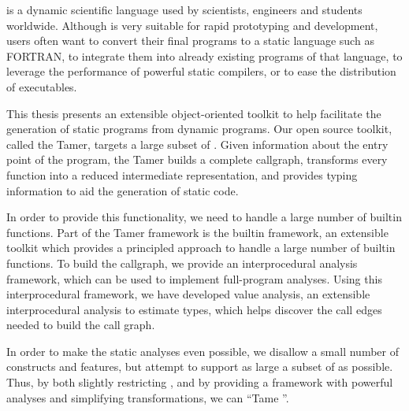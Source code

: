 
\matlab is a dynamic scientific language used by scientists, engineers and
students worldwide.  Although \matlab is very suitable for rapid prototyping
and development,  \matlab users
often want to convert their final \matlab programs to a static language such as {\sc
FORTRAN}, to integrate them into already existing programs of that language,
to leverage the performance of powerful static compilers, or to 
ease the distribution of executables.

This thesis presents an extensible object-oriented toolkit to help
facilitate the generation of static programs from dynamic \matlab
programs.  Our open source toolkit, called the \matlab Tamer, targets
a large subset of \matlab. Given information about the entry point of
the program, the \matlab Tamer builds a complete callgraph, transforms
every function into a reduced intermediate representation, and
provides typing information to aid the generation of static code.

In order to provide this functionality, we need to handle a large
number of \matlab builtin functions. Part of the Tamer framework is
the builtin framework, an extensible toolkit which provides a
principled approach to handle a large number of builtin functions.  To
build the callgraph, we provide an interprocedural analysis framework,
which can be used to implement full-program analyses.  Using this
interprocedural framework, we have developed value analysis, an extensible
interprocedural analysis to estimate \matlab types, which helps
discover the call edges needed to build the call graph.

In order to make the static analyses even possible, we disallow a
small number of \matlab constructs and features, but attempt to
support as large a subset of \matlab as possible.  Thus, by both
slightly restricting \matlab, and by providing a framework with
powerful analyses and simplifying transformations, we can
``Tame \matlab''.




